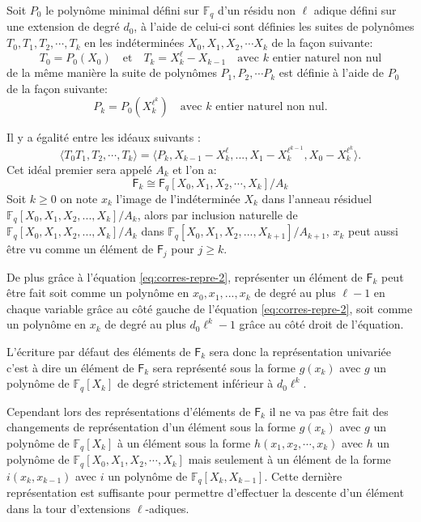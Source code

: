 \documentclass[10pt,a4paper]{book}
\theoremstyle{plain}
\theoremstyle{definition}
\theoremstyle{definition}
\theoremstyle{definition}
\theoremstyle{definition}
\theoremstyle{remark}
\theoremstyle{remark}
\begin{document}
Soit $P_0$ le polynôme minimal défini sur $\mathbb{F}_q$ d'un résidu non $\ell$ adique défini sur une extension de degré $d_0$, à l'aide de celui-ci sont définies les suites de polynômes $T_0,T_1,T_2,\cdots, T_k$ en les indéterminées $X_0,X_1,X_2, \cdots X_k$ de la façon suivante:
\[
T_0=P_0(X_0) \quad \text{et} \quad T_k=X_k^{\ell}-X_{k-1} \quad \text{avec $k$ entier naturel non nul}
\]  de la même manière la suite de polynômes $P_1,P_2, \cdots P_k$ est définie à l'aide de $P_0$ de la façon suivante:
\[
P_k=P_0(X_k^{\ell^k}) \quad \text{avec $k$ entier naturel non nul.} 
\]

Il y a égalité entre les idéaux suivants :
\begin{equation}
\label{eq:corres-repre-2}
\langle T_0 T_1, T_2, \cdots, T_k \rangle = \langle P_k, X_{k-1}-X_k^{\ell}, ..., X_1-X_{k}^{\ell^{k-1}}, X_0-X_k^{\ell^k} \rangle.
\end{equation}
Cet idéal premier sera appelé $A_k$ et l'on a:
\[
\mathsf{F}_k \cong \mathsf{F}_q[X_0,X_1,X_2,\cdots,X_k]/A_k
\]
Soit $k \geqslant 0$  on note $x_k$ l'image de l'indéterminée $X_k$ dans l'anneau résiduel $\mathbb{F}_q[X_0,X_1,X_2, ...,X_k]/A_k$, alors par inclusion naturelle de $\mathbb{F}_q[X_0,X_1,X_2, ...,X_k]/A_k$ dans $\mathbb{F}_q[X_0,X_1,X_2, ...,X_{k+1}]/A_{k+1}$, $x_k$ peut aussi être vu comme un élément de $\mathsf{F}_{j}$ pour $j \geqslant k$.

De plus grâce à l'équation \eqref{eq:corres-repre-2}, représenter un élément de $\mathsf{F}_k$ peut être fait soit comme un polynôme en $x_0,x_1, ..., x_k$ de degré au plus $\ell-1$ en chaque variable grâce au côté gauche de l'équation \eqref{eq:corres-repre-2}, soit comme un polynôme en $x_k$ de degré au plus $d_0\ell^k-1$ grâce au côté droit de l'équation.

L'écriture par défaut des éléments de $\mathsf{F}_k$ sera donc la représentation univariée c'est à dire un élément de $\mathsf{F}_k$ sera représenté sous la forme $g(x_k)$ avec $g$ un polynôme de $\mathbb{F}_q[X_k]$ de degré strictement inférieur à $d_0\ell^k$. 

Cependant lors des représentations d'éléments de $\mathsf{F}_k$ il ne va pas être fait des changements de représentation d'un élément sous la forme $g(x_k)$ avec $g$ un polynôme de $\mathbb{F}_q[X_k]$ à un élément sous la forme $h(x_1,x_2,\cdots,x_k)$ avec $h$ un polynôme de $\mathbb{F}_q[X_0,X_1,X_2,\cdots,X_k]$ mais seulement à un élément de la forme $i(x_k,x_{k-1})$ avec $i$ un polynôme de $\mathbb{F}_q[X_k,X_{k-1}]$. Cette dernière représentation est suffisante pour permettre d'effectuer la descente d'un élément dans la tour d'extensions $\ell$-adiques.
\end{document}
